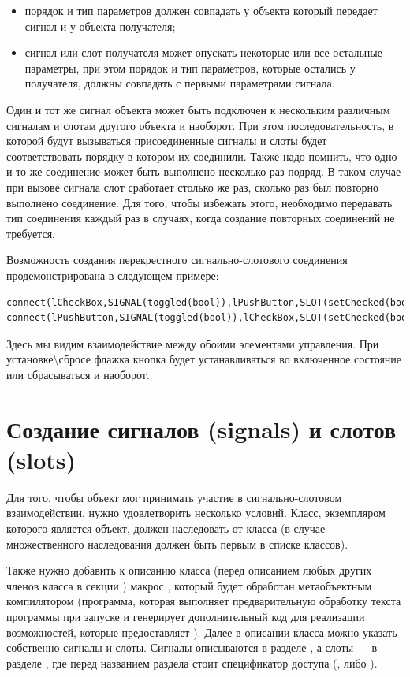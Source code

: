 \begin{itemize}
\item порядок и тип параметров должен совпадать у объекта который передает сигнал и у объекта-получателя;
\item сигнал или слот получателя может опускать некоторые или все остальные параметры, при этом порядок и тип
параметров, которые остались у получателя, должны совпадать с первыми параметрами сигнала.
\end{itemize}
Один и тот же сигнал объекта может быть подключен к нескольким различным сигналам и слотам другого объекта и наоборот.
При этом последовательность, в которой будут вызываться присоединенные сигналы и слоты будет соответствовать порядку в
котором их соединили. Также надо помнить, что одно и то же соединение может быть выполнено несколько раз подряд. В
таком случае при вызове сигнала слот сработает столько же раз, сколько раз был повторно выполнено соединение. Для того,
чтобы избежать этого, необходимо передавать тип соединения  каждый раз в случаях, когда
создание повторных соединений не требуется.

Возможность создания перекрестного сигнально-слотового соединения продемонстрирована в следующем примере:
\begin{lstlisting}
connect(lCheckBox,SIGNAL(toggled(bool)),lPushButton,SLOT(setChecked(bool)));
connect(lPushButton,SIGNAL(toggled(bool)),lCheckBox,SLOT(setChecked(bool)));
\end{lstlisting}

Здесь мы видим взаимодействие между обоими элементами управления. При установке{\textbackslash}сбросе флажка кнопка
будет устанавливаться во включенное состояние или сбрасываться и наоборот.

\section[Создание сигналов (signals) и слотов (slots)]{Создание сигналов (signals) и слотов (slots)}
Для того, чтобы объект мог принимать участие в сигнально-слотовом взаимодействии, нужно удовлетворить несколько условий.
Класс, экземпляром которого является объект, должен наследовать от класса  (в случае множественного
наследования  должен быть первым в списке классов). 

Также нужно добавить к описанию класса (перед описанием любых других членов класса в секции ) макрос
, который будет обработан метаобъектным компилятором  (программа, которая выполняет
предварительную обработку текста программы при запуске  и генерирует дополнительный код для реализации
возможностей, которые предоставляет ). Далее в описании класса можно указать собственно сигналы и слоты.
Сигналы описываются в разделе , а слоты ---  в разделе , где перед названием
раздела стоит спецификатор доступа (,  либо ). 

